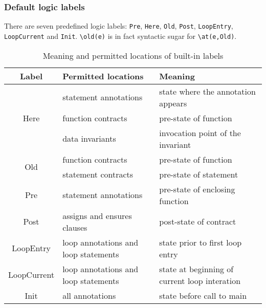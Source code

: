 

\subsubsection*{Default logic labels}\label{sec:default-logic-labels}
There are seven predefined logic labels: \lstinline|Pre|, \lstinline|Here|,
\lstinline|Old|,
\lstinline|Post|, \lstinline|LoopEntry|, \lstinline|LoopCurrent|
and \lstinline|Init|.
\lstinline|\old(e)| is
in fact syntactic sugar for \lstinline|\at(e,Old)|.

\begin{table}
\caption{Meaning and permitted locations of built-in labels}
\label{tab:lables}
\begin{tabular}[t]{|c|p{2.3in}|p{2.3in}|}
\hline
Label & Permitted locations & Meaning \\
\hline
\multirow{3}{*}{Here} & statement annotations & state where the annotation appears \\
                              & function contracts & pre-state of function \\
                              & data invariants & invocation point of the invariant  \\
\hline
\multirow{2}{*}{Old} & function contracts & pre-state of function \\
                             & statement contracts & pre-state of statement \\
\hline
Pre & statement annotations & pre-state of enclosing function \\
\hline
Post & assigns and ensures clauses & post-state of contract \\
\hline
LoopEntry & loop annotations and loop statements & state prior to first loop entry \\
\hline
LoopCurrent & loop annotations and loop statements & state at beginning of current loop interation \\
\hline
Init & all annotations & state before call to main \\
\hline
\end{tabular}
\end{table}


